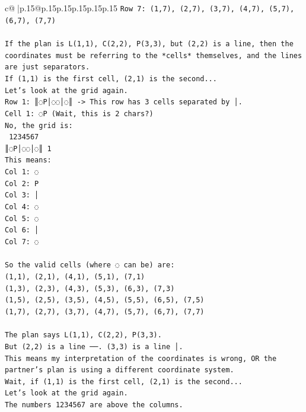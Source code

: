 \documentclass{article}
\begin{document}
{\begin{supertabular}{c@{$\;$}|p{.15\linewidth}@{}p{.15\linewidth}p{.15\linewidth}p{.15\linewidth}p{.15\linewidth}p{.15\linewidth}}
{{{\texttt{Row 7: (1,7), (2,7), (3,7), (4,7), (5,7), (6,7), (7,7)} \\
\\ 
\texttt{If the plan is L(1,1), C(2,2), P(3,3), but (2,2) is a line, then the coordinates must be referring to the *cells* themselves, and the lines are just separators.} \\
\texttt{If (1,1) is the first cell, (2,1) is the second...} \\
\texttt{Let's look at the grid again.} \\
\texttt{Row 1: ║◌P│◌◌│◌║ {-}> This row has 3 cells separated by │.} \\
\texttt{Cell 1: ◌P (Wait, this is 2 chars?)} \\
\texttt{No, the grid is:} \\
\texttt{ 1234567} \\
\texttt{║◌P│◌◌│◌║ 1} \\
\texttt{This means:} \\
\texttt{Col 1: ◌} \\
\texttt{Col 2: P} \\
\texttt{Col 3: │} \\
\texttt{Col 4: ◌} \\
\texttt{Col 5: ◌} \\
\texttt{Col 6: │} \\
\texttt{Col 7: ◌} \\
\\ 
\texttt{So the valid cells (where ◌ can be) are:} \\
\texttt{(1,1), (2,1), (4,1), (5,1), (7,1)} \\
\texttt{(1,3), (2,3), (4,3), (5,3), (6,3), (7,3)} \\
\texttt{(1,5), (2,5), (3,5), (4,5), (5,5), (6,5), (7,5)} \\
\texttt{(1,7), (2,7), (3,7), (4,7), (5,7), (6,7), (7,7)} \\
\\ 
\texttt{The plan says L(1,1), C(2,2), P(3,3).} \\
\texttt{But (2,2) is a line ──. (3,3) is a line │.} \\
\texttt{This means my interpretation of the coordinates is wrong, OR the partner's plan is using a different coordinate system.} \\
\texttt{Wait, if (1,1) is the first cell, (2,1) is the second...} \\
\texttt{Let's look at the grid again.} \\
\texttt{The numbers 1234567 are above the columns.} \\
}}}
\end{supertabular}}
\end{document}

